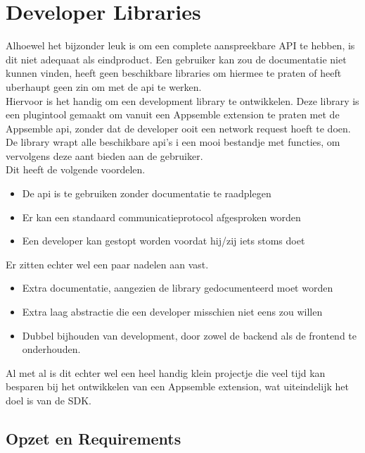 \chapter{Developer Libraries}

Alhoewel het bijzonder leuk is om een complete aanspreekbare API te hebben, is dit niet adequaat als eindproduct. Een gebruiker kan zou de documentatie niet kunnen vinden, heeft geen beschikbare libraries om hiermee te praten of heeft uberhaupt geen zin om met de api te werken. \\

Hiervoor is het handig om een development library te ontwikkelen. Deze library is een plugintool gemaakt om vanuit een Appsemble extension te praten met de Appsemble api, zonder dat de developer ooit een network request hoeft te doen. De library wrapt alle beschikbare api's i een mooi bestandje met functies, om vervolgens deze aant bieden aan de gebruiker. \\ 

Dit heeft de volgende voordelen.

\begin{itemize}
	\item De api is te gebruiken zonder documentatie te raadplegen
	\item Er kan een standaard communicatieprotocol afgesproken worden
	\item Een developer kan gestopt worden voordat hij/zij iets stoms doet
\end{itemize}

Er zitten echter wel een paar nadelen aan vast.

\begin{itemize}
	\item Extra documentatie, aangezien de library gedocumenteerd moet worden
	\item Extra laag abstractie die een developer misschien niet eens zou willen
	\item Dubbel bijhouden van development, door zowel de backend als de frontend te onderhouden.
\end{itemize}

Al met al is dit echter wel een heel handig klein projectje die veel tijd kan besparen bij het ontwikkelen van een Appsemble extension, wat uiteindelijk het doel is van de SDK. \\

\section{Opzet en Requirements}

